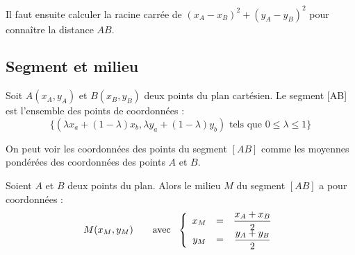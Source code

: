 \documentclass[a4paper, 12pt]{report}
\begin{document}
\begin{rmq}
Il faut ensuite calculer la racine carrée de $(x_A - x_B)^2 + (y_A - y_B)^2$ pour connaître la distance $AB$.
\end{rmq}

\subsection{Segment et milieu}

\begin{defn}[Segment]
Soit $A(x_A, y_A)$ et $B(x_B, y_B)$ deux points du plan cartésien. Le segment [AB] est l'ensemble des points de coordonnées :
\[ \{ (\lambda x_a + (1-\lambda) x_b , \lambda y_a + (1-\lambda) y_b) \text{ tels que } 0 \leq \lambda \leq 1 \} \] 
\end{defn}

\begin{rmq}
On peut voir les coordonnées des points du segment $[AB]$ comme les moyennes pondérées des coordonnées des points $A$ et $B$.
\end{rmq}

\begin{thm}
Soient $A$ et $B$ deux points du plan.
Alors le milieu $M$ du segment $[AB]$ a pour coordonnées :
	\[ M(x_M, y_M) \qquad \text{avec~~} \left \{ \begin{array}{c c c} x_M & = & \dfrac{x_A + x_B}2 \\ y_M & = & \dfrac{y_A + y_B}2 \end{array} \right. \]
\end{thm}
\end{document}
